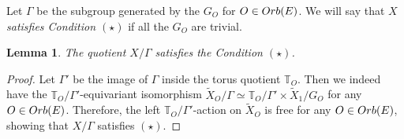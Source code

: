 \documentclass[11pt, reqno]{amsart}
\theoremstyle{plain}
\newtheorem{lemma}[theorem]{Lemma}
\theoremstyle{definition}
\theoremstyle{remark}
\begin{document}
Let $\Gamma$ be the  subgroup generated 
by the $G_{O}$ for  $O\in {\rm Orb}(E)$. We will say that $X$ \emph{satisfies Condition $(\star)$} if all the $G_{O}$ are trivial.
\begin{lemma}\label{lem:quo}
    The quotient $X/\Gamma$ satisfies the Condition $(\star)$.
\end{lemma}
\begin{proof} Let $\Gamma'$ be the image of $\Gamma$ inside the torus quotient $\mathbb{T}_{O}$. Then we indeed have the $\mathbb{T}_{O}/\Gamma'$-equivariant isomorphism $\widetilde{X}_{O}/ \Gamma \simeq \mathbb{T}_{O}/ \Gamma' \times \widetilde{X}_{1}/G_{O}$ for any $O\in {\rm Orb}(E)$. Therefore, the left $\mathbb{T}_{O}/\Gamma'$-action on $\widetilde{X}_{O}$ is free for any $O\in{\rm Orb}(E)$, showing that $X/\Gamma$ satisfies $(\star)$.
\end{proof}

\end{document}
